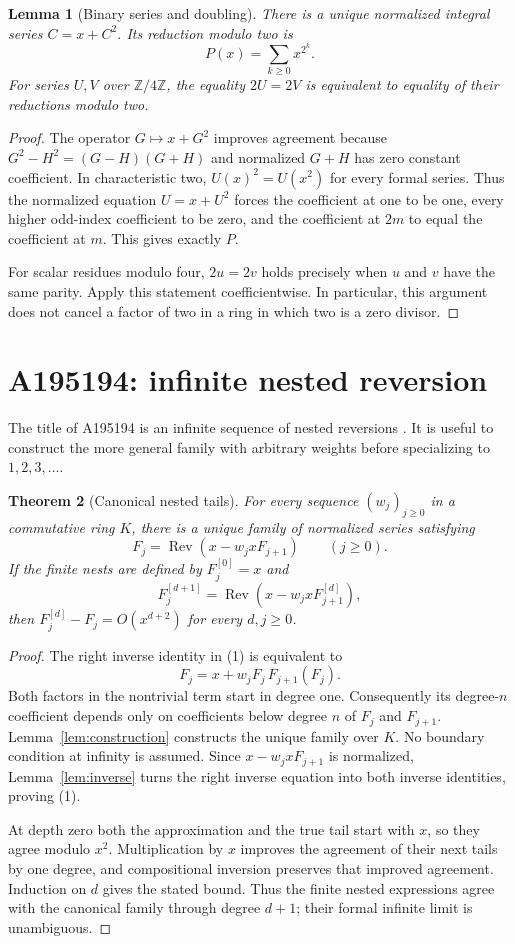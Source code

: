 \documentclass[11pt,a4paper]{article}
\newtheorem{theorem}{Theorem}[section]
\newtheorem{lemma}[theorem]{Lemma}
\theoremstyle{remark}
\newcommand{\Z}{\mathbb Z}
\newcommand{\Rev}{\operatorname{Rev}}
\begin{document}
\begin{lemma}[Binary series and doubling]\label{lem:binary}
There is a unique normalized integral series $C=x+C^2$. Its reduction
modulo two is
\[
 P(x)=\sum_{k\ge0}x^{2^k}.
\]
For series $U,V$ over $\Z/4\Z$, the equality $2U=2V$ is equivalent to
equality of their reductions modulo two.
\end{lemma}

\begin{proof}
The operator $G\mapsto x+G^2$ improves agreement because
$G^2-H^2=(G-H)(G+H)$ and normalized $G+H$ has zero constant coefficient.
In characteristic two, $U(x)^2=U(x^2)$ for every formal series. Thus the
normalized equation $U=x+U^2$ forces the coefficient at one to be one,
every higher odd-index coefficient to be zero, and the coefficient at
$2m$ to equal the coefficient at $m$. This gives exactly $P$.

For scalar residues modulo four, $2u=2v$ holds precisely when $u$ and $v$
have the same parity. Apply this statement coefficientwise. In
particular, this argument does not cancel a factor of two in a ring in
which two is a zero divisor.
\end{proof}

\section{A195194: infinite nested reversion}

The title of A195194 is an infinite sequence of nested reversions
\cite{oeis194}. It is useful to construct the more general family with
arbitrary weights before specializing to $1,2,3,\ldots$.

\begin{theorem}[Canonical nested tails]\label{thm:tails}
For every sequence $(w_j)_{j\ge0}$ in a commutative ring $K$, there is a
unique family of normalized series satisfying
\[
 F_j=\Rev(x-w_jxF_{j+1})\qquad(j\ge0). \tag{1}
\]
If the finite nests are defined by $F_j^{[0]}=x$ and
\[
 F_j^{[d+1]}=\Rev(x-w_jxF_{j+1}^{[d]}),
\]
then $F_j^{[d]}-F_j=O(x^{d+2})$ for every $d,j\ge0$.
\end{theorem}

\begin{proof}
The right inverse identity in (1) is equivalent to
\[
 F_j=x+w_jF_j\,F_{j+1}(F_j). \tag{2}
\]
Both factors in the nontrivial term start in degree one. Consequently its
degree-$n$ coefficient depends only on coefficients below degree $n$ of
$F_j$ and $F_{j+1}$. Lemma~\ref{lem:construction} constructs the unique
family over $K$. No boundary condition at infinity is assumed.
Since $x-w_jxF_{j+1}$ is normalized, Lemma~\ref{lem:inverse} turns the
right inverse equation into both inverse identities, proving (1).

At depth zero both the approximation and the true tail start with $x$,
so they agree modulo $x^2$. Multiplication by $x$ improves the agreement
of their next tails by one degree, and compositional inversion preserves
that improved agreement. Induction on $d$ gives the stated bound. Thus
the finite nested expressions agree with the canonical family through
degree $d+1$; their formal infinite limit is unambiguous.
\end{proof}
\end{document}
